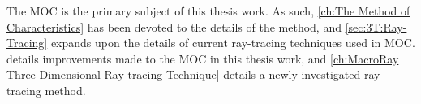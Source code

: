{{    The \ac{MOC} is the primary subject of this thesis work.
    As such, \cref{ch:The Method of Characteristics} has been devoted to the details of the method, and \cref{sec:3T:Ray-Tracing} expands upon the details of current ray-tracing techniques used in \ac{MOC}.
     details improvements made to the \ac{MOC} in this thesis work, and \cref{ch:MacroRay Three-Dimensional Ray-tracing Technique} details a newly investigated ray-tracing method.
  }

  \printbibliography
}

